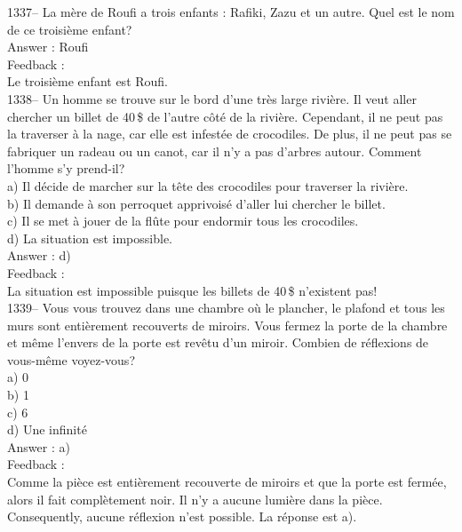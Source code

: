 \documentclass[letterpaper, 12pt]{article}
\begin{document}
1337-- La m\`ere de Roufi a trois enfants : Rafiki, Zazu et un autre.  Quel
est le nom de ce troisi\`eme enfant?\\

Answer : Roufi\\

Feedback : \\
Le troisi\`eme enfant est Roufi.\\

1338-- Un homme se trouve sur le bord d'une tr\`es large rivi\`ere.  Il veut
aller chercher un billet de 40\,\$ de l'autre c\^ot\'e de la rivi\`ere.
Cependant, il ne peut pas la traverser \`a la nage, car elle est infest\'ee
de crocodiles.  De plus, il ne peut pas se fabriquer un radeau ou un canot,
car il n'y a pas d'arbres autour.  Comment l'homme s'y prend-il?\\
a) Il d\'ecide de marcher sur la t\^ete des crocodiles  pour traverser la
rivi\`ere.\\
b) Il demande \`a son perroquet apprivois\'e d'aller lui chercher le
billet.\\
c) Il se met \`a jouer de la fl\^ute pour endormir tous les crocodiles. \\
d) La situation est impossible.\\

Answer : d)\\

Feedback : \\
La situation est impossible puisque les billets de 40\,\$ n'existent pas! \\

1339-- Vous vous trouvez dans une chambre o\`u le plancher, le plafond et
tous les murs sont enti\`erement recouverts de miroirs.  Vous fermez la
porte de la chambre et m\^eme l'envers de la porte est rev\^etu d'un miroir.
  Combien de r\'eflexions de vous-m\^eme voyez-vous?\\
a) 0\\
b) 1\\
c) 6\\
d) Une infinit\'e\\

Answer : a)\\

Feedback : \\
Comme la pi\`ece est enti\`erement recouverte de miroirs et que la porte est
ferm\'ee, alors il fait compl\`etement noir.  Il n'y a aucune lumi\`ere dans
la pi\`ece.  Consequently, aucune r\'eflexion n'est possible.  La
r\'eponse est a).\\
\end{document}
